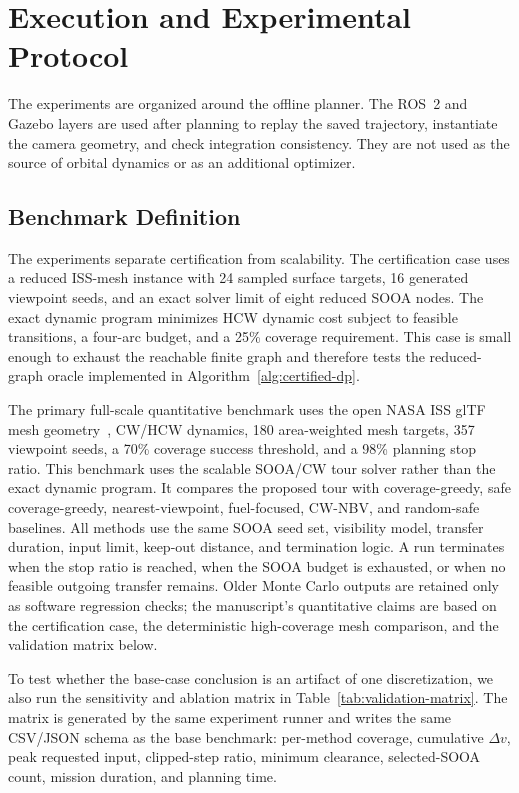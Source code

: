 \section{Execution and Experimental Protocol}
\label{sec:simulation}
\label{sec:online}

The experiments are organized around the offline planner. The ROS~2 and
Gazebo layers are used after planning to replay the saved trajectory,
instantiate the camera geometry, and check integration consistency. They are
not used as the source of orbital dynamics or as an additional optimizer.

\subsection{Benchmark Definition}

The experiments separate certification from scalability. The certification
case uses a reduced ISS-mesh instance with 24 sampled surface targets, 16
generated viewpoint seeds, and an exact solver limit of eight reduced SOOA
nodes. The exact dynamic program minimizes HCW dynamic cost subject to feasible
transitions, a four-arc budget, and a 25\% coverage requirement. This case is
small enough to exhaust the reachable finite graph and therefore tests the
reduced-graph oracle implemented in Algorithm~\ref{alg:certified-dp}.

The primary full-scale quantitative benchmark uses the open NASA ISS glTF mesh
geometry~\cite{nasa_iss_gltf_model}, CW/HCW dynamics, 180 area-weighted mesh
targets, 357 viewpoint seeds, a 70\% coverage success threshold, and a
98\% planning stop ratio. This benchmark uses the scalable SOOA/CW tour solver
rather than the exact dynamic program. It compares the
proposed tour with coverage-greedy, safe coverage-greedy, nearest-viewpoint,
fuel-focused, CW-NBV, and random-safe baselines. All methods use the same
SOOA seed set, visibility model, transfer duration, input limit, keep-out
distance, and termination logic. A run terminates when the stop ratio is
reached, when the SOOA budget is exhausted, or when no feasible outgoing
transfer remains. Older Monte Carlo outputs are retained only as software
regression checks; the manuscript's quantitative claims are based on the
certification case, the deterministic high-coverage mesh comparison, and the
validation matrix below.

To test whether the base-case conclusion is an artifact of one discretization,
we also run the sensitivity and ablation matrix in
Table~\ref{tab:validation-matrix}. The matrix is generated by the same
experiment runner and writes the same CSV/JSON schema as the base benchmark:
per-method coverage, cumulative $\Delta v$, peak requested input,
clipped-step ratio, minimum clearance, selected-SOOA count, mission duration,
and planning time.

